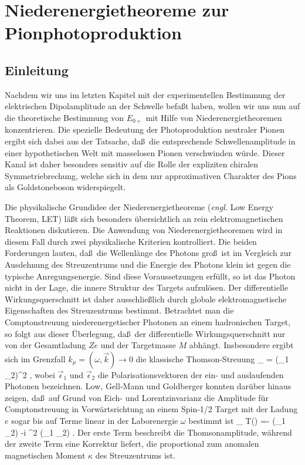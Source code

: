 \chapter{Niederenergietheoreme zur Pionphotoproduktion}
\section{Einleitung}
Nachdem wir uns im letzten Kapitel mit der experimentellen 
Bestimmung der elektrischen Dipolamplitude an der Schwelle
befa\ss t haben, wollen wir uns nun auf die theoretische 
Bestimmung von $E_{0+}$ mit Hilfe von Niederenergietheoremen
konzentrieren. Die spezielle Bedeutung der Photoproduktion
neutraler Pionen ergibt sich dabei aus der Tatsache, da\ss\
die entsprechende Schwellenamplitude in einer hypothetischen Welt
mit masselosen Pionen  verschwinden w\"urde.
Dieser Kanal ist daher besonders sensitiv auf die Rolle der
expliziten chiralen Symmetriebrechung, welche sich in  dem
nur approximativen Charakter des Pions als Goldstoneboson 
widerspiegelt. 

Die physikalische Grundidee der Niederenergietheoreme
({\em engl.} Low Energy Theorem, LET) l\"a\ss t sich besonders
\"ubersichtlich an rein elektromagnetischen Reaktionen
diskutieren. Die Anwendung  von Niederenergietheoremen wird 
in diesem Fall durch zwei physikalische Kriterien kontrolliert. 
Die beiden Forderungen lauten, da\ss\ die Wellenl\"ange des 
Photons gro\ss\ ist im Vergleich zur Ausdehnung des Streuzentrums
und die Energie des Photons klein ist gegen die typische 
Anregungsenergie. Sind diese Voraussetzungen erf\"ullt, so ist das 
Photon nicht in der Lage, die innere Struktur des Targets aufzul\"osen. 
Der differentielle Wirkungsquerschnitt ist daher ausschlie\ss lich durch 
globale elektromagnetische Eigenschaften des Streuzentrums bestimmt.
Betrachtet man die Comptonstreuung niederenergetischer
Photonen an einem hadronischen Target, so folgt aus dieser
\"Uberlegung, da\ss\ der differentielle Wirkungsquerschnitt 
nur von der Gesamtladung $Ze$  und der Targetmasse $M$ 
abh\"angt. Insbesondere ergibt 
sich im Grenzfall $k_\mu=(\omega,\vec{k})\to 0$ die klassische
Thomson-Streuung
\be
\label{thomson}
 \lim_{\omega {}}  =
   (\vec{\epsilon}_1 \cdot\vec{\epsilon}_2)^2 ,
\ee     
wobei $\vec{\epsilon}_1$ und $\vec{\epsilon}_2$ die 
Polarisationsvektoren der ein- und auslaufenden Photonen
bezeichnen. Low, Gell-Mann und Goldberger \cite{Low54,Low58,GMG54}
konnten dar\"uber hinaus zeigen, da\ss\ auf Grund von 
Eich- und Lorentzinvarianz die Amplitude f\"ur Comptonstreuung 
in Vorw\"artsrichtung an einem Spin-1/2 Target mit der Ladung $e$ sogar 
bis auf Terme linear in der Laborenergie $\omega$ bestimmt ist
\be
 \lim_{\omega {}}  T(\omega) =-   
  (\vec{\epsilon}_1 \cdot\vec{\epsilon}_2) -i 
  \kappa^2 \omega  (\vec{\epsilon}_1 \times\vec{\epsilon}_2)
  \cdot \vec{\sigma} \; .
\ee
Der erste Term beschreibt  die Thomsonamplitude, w\"ahrend der
zweite Term eine Korrektur liefert, die proportional zum
anomalen magnetischen Moment $\kappa$ des Streuzentrums ist.

